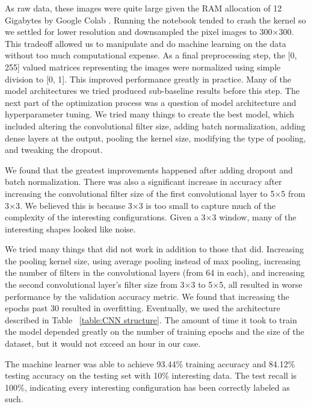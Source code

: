 \documentclass[12pt]{article}
\numberwithin{figure}{section} %
\begin{document}
As raw data, these images were quite large given the RAM allocation of 12 Gigabytes by Google Colab \cite{Google Colab}. Running the notebook tended to crash the kernel so we settled for lower resolution and downsampled the pixel images to 300×300. This tradeoff allowed us to manipulate and do machine learning on the data without too much computational expense. As a final preprocessing step, the [0, 255] valued matrices representing the images were normalized using simple division to [0, 1]. This improved performance greatly in practice. Many of the model architectures we tried produced sub-baseline results before this step. The next part of the optimization process was a question of model architecture and hyperparameter tuning. We tried many things to create the best model, which included altering the convolutional filter size, adding batch normalization, adding dense layers at the output, pooling the kernel size, modifying the type of pooling, and tweaking the dropout.  

We found that the greatest improvements happened after adding dropout and batch normalization. There was also a significant increase in accuracy after increasing the convolutional filter size of the first convolutional layer to 5×5 from 3×3. We believed this is because 3×3 is too small to capture much of the complexity of the interesting configurations. Given a 3×3 window, many of the interesting shapes looked like noise.

We tried many things that did not work in addition to those that did. Increasing the pooling kernel size, using average pooling instead of max pooling, increasing the number of filters in the convolutional layers (from 64 in each), and increasing the second convolutional layer’s filter size from 3×3 to 5×5, all resulted in worse performance by the validation accuracy metric. We found that increasing the epochs past 30 resulted in overfitting. Eventually, we used the architecture described in Table ~\ref{table:CNN structure}. The amount of time it took to train the model depended greatly on the number of training epochs and the size of the dataset, but it would not exceed an hour in our case. 

The machine learner was able to achieve 93.44\% training accuracy and 84.12\% testing accuracy on the testing set with 10\% interesting data. The test recall is 100\%, indicating every interesting configuration has been correctly labeled as such. 
\end{document}
